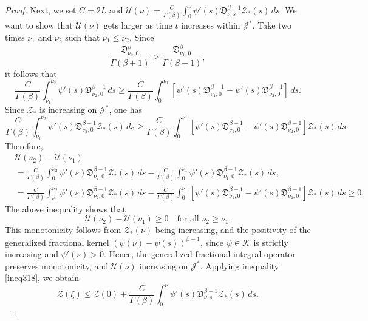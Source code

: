 \documentclass[reqno]{amsart}
\begin{document}
\begin{proof}
Next, we set $C=2 L$ and $\mathcal{U}(\nu )=\frac{C}{\Gamma(\beta)}
 \int_0^{\nu } \psi'(s)\mathfrak{D}_{\nu ,s}^{\beta-1} \mathcal{Z}_{*}(s)\,ds$.
We want to show that \( \mathcal{U}(\nu ) \) gets larger as time \( t \) 
increases within \( \mathcal{J}^{*} \). 
Take two times \( \nu _1 \) and \( \nu _2 \) such that 
\( \nu _1 \leq \nu _2 \). Since
$$
\frac{\mathfrak{D}_{\nu _2,0}^{\beta}}{\Gamma(\beta+1)} 
\geq \frac{\mathfrak{D}_{\nu _1,0}^{\beta}}{\Gamma(\beta+1)},
$$
it follows that
$$
\frac{C}{\Gamma(\beta)} \int_{\nu _{1}}^{\nu _{2}} \psi'(s)
\mathfrak{D}_{\nu _{2},0}^{\beta-1}\,ds 
\geq \frac{C}{\Gamma(\beta)} \int_0^{\nu _{1}}[\psi'(s)\mathfrak{D}_{\nu _{1},0}^{\beta-1} -\psi'(s)\mathfrak{D}_{\nu _{2},0}^{\beta-1} ]\,ds.
$$
Since $\mathcal{Z}_{*}$ is increasing on $\mathcal{J}^{*}$, one has
$$
\frac{C}{\Gamma(\beta)} \int_{\nu _{1}}^{\nu _{2}} 
\psi'(s)\mathfrak{D}_{\nu _{2},0}^{\beta-1} \mathcal{Z}_{*}(s)\,ds 
\geq \frac{C}{\Gamma(\beta)} \int_0^{\nu _{1}}[\psi'(s)
\mathfrak{D}_{\nu _{1},0}^{\beta-1} -\psi'(s)\mathfrak{D}_{\nu _{2},0}^{\beta-1} ]
 \mathcal{Z}_{*}(s)\,ds.
$$
Therefore, 
\begin{align*}
&\mathcal{U}(\nu _{2})-\mathcal{U}(\nu _{1}) \\
& =\frac{C}{\Gamma(\beta)} \int_0^{\nu _{2}} \psi'(s)
 \mathfrak{D}_{\nu _{2},0}^{\beta-1} \mathcal{Z}_{*}(s)\,ds
  -\frac{C}{\Gamma(\beta)} \int_0^{\nu _{1}} \psi'(s)\mathfrak{D}_{\nu _{1},0}^{\beta-1}
   \mathcal{Z}_{*}(s)\,ds, \\
& =\frac{C}{\Gamma(\beta)} \int_{\nu _{1}}^{\nu _{2}} \psi'(s)
 \mathfrak{D}_{\nu _{2},0}^{\beta-1} \mathcal{Z}_{*}(s)\,ds
 -\frac{C}{\Gamma(\beta)} \int_0^{\nu _{1}}[\psi'(s)\mathfrak{D}_{\nu _{1},0}^{\beta-1}
  -\psi'(s)\mathfrak{D}_{\nu _{2},0}^{\beta-1} ] 
 \mathcal{Z}_{*}(s)\,ds \geq 0.
\end{align*}
The above inequality shows that
\[
\mathcal{U}(\nu_2)-\mathcal{U}(\nu_1)\ge 0
\quad \text{for all } \nu_2\ge\nu_1.
\]
This monotonicity follows from  \(\mathcal{Z}_{*}(\nu)\) being increasing,
and the positivity of the generalized fractional kernel
$(\psi(\nu)-\psi(s))^{\beta-1}$, since $\psi\in\mathcal{K}$ is strictly
increasing and $\psi'(s)>0$.
Hence, the generalized fractional integral operator preserves
monotonicity, and $\mathcal{U}(\nu)$ increasing on $\mathcal{J}^*$.
Applying inequality \eqref{ineq318}, we obtain
\begin{equation}\label{ineq320}
\mathcal{Z}(\xi) \leq \mathcal{Z}(0)+\frac{C}{\Gamma(\beta)} 
\int_0^{\nu } \psi'(s)\mathfrak{D}_{\nu ,s}^{\beta-1} \mathcal{Z}_{*}(s)\,ds.

\end{equation}
\end{proof}
\end{document}
